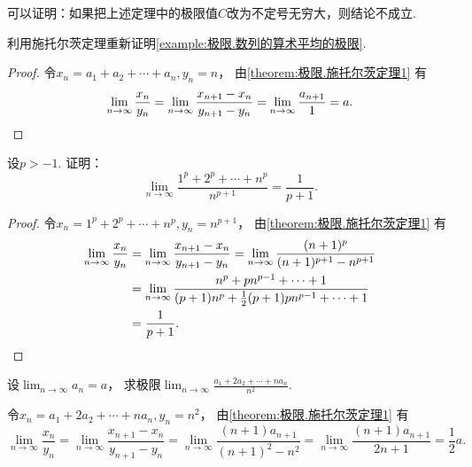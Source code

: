 \begin{remark}
可以证明：如果把上述定理中的极限值\(C\)改为不定号无穷大，则结论不成立.
\end{remark}

\begin{example}
利用施托尔茨定理重新证明\cref{example:极限.数列的算术平均的极限}.
\begin{proof}
令\(x_n=a_1+a_2+\dotsb+a_n,y_n=n\)，
由\cref{theorem:极限.施托尔茨定理1} 有\begin{equation*}
	\lim_{n\to\infty} \frac{x_n}{y_n}
	= \lim_{n\to\infty} \frac{x_{n+1}-x_n}{y_{n+1}-y_n}
	= \lim_{n\to\infty} \frac{a_{n+1}}{1}
	= a.
	\qedhere
\end{equation*}
\end{proof}
\end{example}

\begin{example}
设\(p>-1\).
证明：\begin{equation}\label{equation:数列极限.重要极限X}
	\lim_{n\to\infty} \frac{1^p+2^p+\dotsb+n^p}{n^{p+1}}
	= \frac{1}{p+1}.
\end{equation}
\begin{proof}
令\(x_n=1^p+2^p+\dotsb+n^p,
y_n=n^{p+1}\)，
由\cref{theorem:极限.施托尔茨定理1} 有\begin{align*}
	\lim_{n\to\infty} \frac{x_n}{y_n}
	&= \lim_{n\to\infty} \frac{x_{n+1}-x_n}{y_{n+1}-y_n}
	= \lim_{n\to\infty} \frac{(n+1)^p}{(n+1)^{p+1} - n^{p+1}} \\
	&= \lim_{n\to\infty} \frac{n^p + p n^{p-1} + \dotsb + 1}
		{(p+1) n^p + \frac{1}{2} (p+1) p n^{p-1} + \dotsb + 1} \\
	&= \frac{1}{p+1}.
	\qedhere
\end{align*}
\end{proof}
\end{example}

\begin{example}
设\(\lim_{n\to\infty} a_n = a\)，
求极限\(\lim_{n\to\infty} \frac{a_1+2a_2+\dotsb+na_n}{n^2}\).
\begin{solution}
令\(x_n=a_1+2a_2+\dotsb+na_n,
y_n=n^2\)，
由\cref{theorem:极限.施托尔茨定理1} 有\begin{equation*}
	\lim_{n\to\infty} \frac{x_n}{y_n}
	= \lim_{n\to\infty} \frac{x_{n+1}-x_n}{y_{n+1}-y_n}
	= \lim_{n\to\infty} \frac{(n+1)a_{n+1}}{(n+1)^2-n^2}
	= \lim_{n\to\infty} \frac{(n+1)a_{n+1}}{2n+1}
	= \frac12 a.
\end{equation*}
\end{solution}
\end{example}
